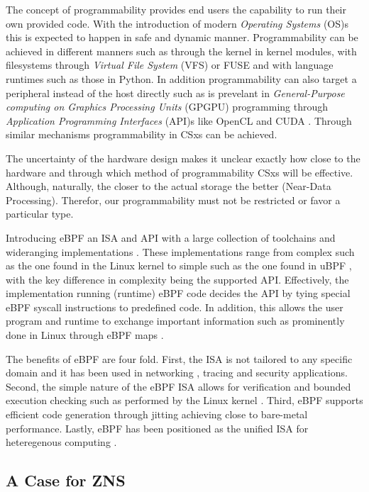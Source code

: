 The concept of programmability provides end users the capability to run their
own provided code. With the introduction of modern \textit{Operating Systems}
(OS)s this is expected to happen in safe and dynamic manner. Programmability
can be achieved in different manners such as through the kernel in kernel
modules, with filesystems through \textit{Virtual File System} (VFS) or FUSE and
with language runtimes such as those in Python. In addition programmability can
also target a peripheral instead of the host directly such as is prevelant in
\textit{General-Purpose computing on Graphics Processing Units} (GPGPU)
programming through \textit{Application Programming Interfaces} (API)s like
OpenCL \cite{opencl} and CUDA \cite{cuda}. Through similar mechanisms
programmability in CSxs can be achieved.

The uncertainty of the hardware design makes it unclear exactly how close to the
hardware and through which method of programmability CSxs will be effective.
Although, naturally, the closer to the actual storage the better
(Near-Data Processing). Therefor, our programmability must not be restricted or
favor a particular type.

Introducing eBPF an ISA and API with a large collection of toolchains and
wideranging implementations \cite{what-ebpf, McCanne1993TheBP}. These
implementations range from complex such as the one found in the Linux kernel to
simple such as the one found in uBPF \cite{ubpf}, with the key difference in
complexity being the supported API. Effectively, the implementation running
(runtime) eBPF code decides the API by tying special eBPF syscall instructions
to predefined code. In addition, this allows the user program and runtime to
exchange important information such as prominently done in Linux through eBPF
maps \cite{bpf-man}.

The benefits of eBPF are four fold. First, the ISA is not tailored to any
specific domain and it has been used in networking \cite{xdp},
tracing \cite{enhanced-ebpf} and security \cite{seccomp} applications. Second,
the simple nature of the eBPF ISA allows for verification and bounded execution
checking such as performed by the Linux kernel \cite{kern-analysis}. Third, eBPF
supports efficient code generation through jitting achieving close to bare-metal
performance. Lastly, eBPF has been positioned as the unified ISA for
heteregenous computing \cite{Brunella2020hXDPES, bpf-uapi}.

\subsection*{A Case for ZNS}


